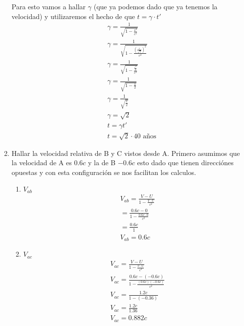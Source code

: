 \documentclass[12pt]{exam}
\begin{document}
\begin{enumerate}
		Para esto vamos a hallar $\gamma$ (que ya podemos dado que ya tenemos la velocidad) y utilizaremos el hecho de que $t = \gamma\cdot t'$ 
		\begin{align*}
			& \gamma = \frac{1}{\sqrt{1-\frac{v^2}{c^2}}}\\
			& \gamma = \frac{1}{\sqrt{1-\frac{\left(\frac{c}{\sqrt{2}}\right)^2}{c^2}}}\\
			& \gamma = \frac{1}{\sqrt{1 - \frac{\frac{c^2}{2}}{c^2}}}\\
			& \gamma = \frac{1}{\sqrt{1 - \frac{1}{2}}}\\
			& \gamma = \frac{1}{\sqrt{\frac{1}{2}}}\\
			& \gamma = \sqrt{2}\\
			& t = \gamma t'\\
			& t = \sqrt{2}\cdot40 \text{ años}
		\end{align*}
	\item Hallar la velocidad relativa de B y C vistos desde A.
		Primero asumimos que la velocidad de A es $0.6c$ y la de B $-0.6c$ esto dado que tienen direcciónes opuestas y con esta configuración se nos facilitan los calculos.
		\begin{enumerate}
			\item $V_{ab}$
				\begin{align*}
					& V_{ab} = \frac{V - U}{1-\frac{V\cdot U}{c^2}}\\
					& = \frac{0.6c - 0}{1 - \frac{0.6c\cdot 0}{c^2}}\\
					& = \frac{0.6c}{1}\\
					& V_{ab} = 0.6c
				\end{align*}
			\item $V_{ac}$
				\begin{align*}
					& V_{ac} = \frac{V - U}{1 - \frac{v\cdot U}{c^2}}\\
					& V_{ac} = \frac{0.6c - (-0.6c)}{1-\frac{(0.6c)(-0.6c)}{c^2}}\\
					& V_{ac} = \frac{1.2c}{1-(-0.36)}\\
					& V_{ac} = \frac{1.2c}{1.36}\\
					& V_{ac} = 0.882c
				\end{align*}
		\end{enumerate}
\end{enumerate}
\end{document}
